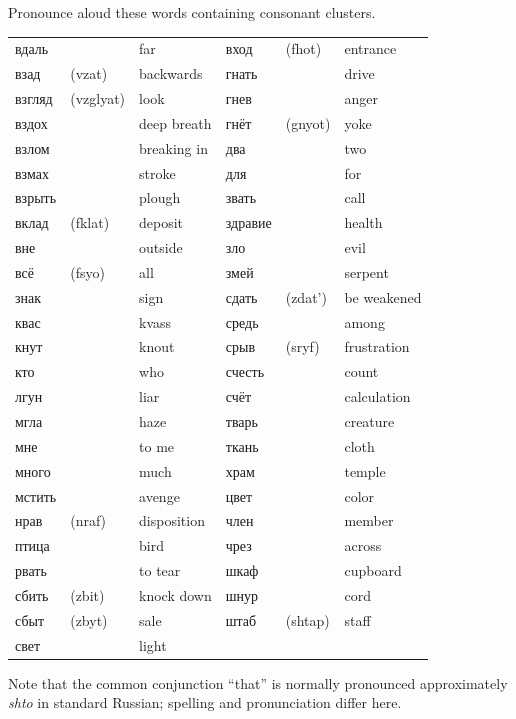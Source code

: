 \begin{keybox}[Exercise 2.5]
Pronounce aloud these words containing consonant clusters.
\end{keybox}

\begingroup
\small
\setlength{\tabcolsep}{1.5pt}
\begin{longtable}{@{}>{\cyrillicfont}p{21mm} p{16mm} p{29mm} >{\cyrillicfont}p{21mm} p{16mm} p{29mm}@{}}
вдаль & & far & вход & (fhot) & entrance\\
взад & (vzat) & backwards & гнать & & drive\\
взгляд & (vzglyat) & look & гнев & & anger\\
вздох & & deep breath & гнёт & (gnyot) & yoke\\
взлом & & breaking in & два & & two\\
взмах & & stroke & для & & for\\
взрыть & & plough & звать & & call\\
вклад & (fklat) & deposit & здравие & & health\\
вне & & outside & зло & & evil\\
всё & (fsyo) & all & змей & & serpent\\
знак & & sign & сдать & (zdat') & be weakened\\
квас & & kvass & средь & & among\\
кнут & & knout & срыв & (sryf) & frustration\\
кто & & who & счесть & & count\\
лгун & & liar & счёт & & calculation\\
мгла & & haze & тварь & & creature\\
мне & & to me & ткань & & cloth\\
много & & much & храм & & temple\\
мстить & & avenge & цвет & & color\\
нрав & (nraf) & disposition & член & & member\\
птица & & bird & чрез & & across\\
рвать & & to tear & шкаф & & cupboard\\
сбить & (zbit) & knock down & шнур & & cord\\
сбыт & (zbyt) & sale & штаб & (shtap) & staff\\
свет & & light & & &\\
\end{longtable}
\endgroup

Note that the common conjunction  ``that'' is normally pronounced approximately \emph{shto} in standard Russian; spelling and pronunciation differ here.

